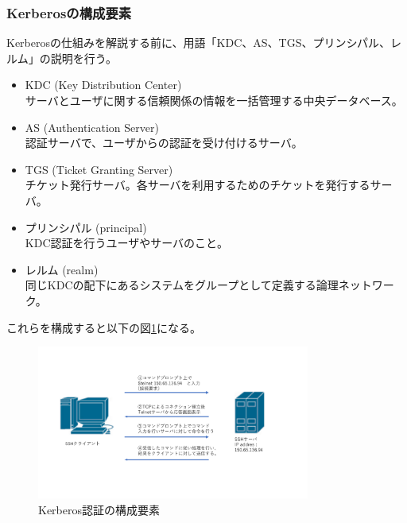 \documentclass[12pt,a4paper,titlepage]{jsarticle}
\begin{document}
\subsubsection*{Kerberosの構成要素}
Kerberosの仕組みを解説する前に、用語「KDC、AS、TGS、プリンシパル、レルム」の説明を行う。
\begin{itemize}
    \item KDC (Key Distribution Center)\mbox{}\\サーバとユーザに関する信頼関係の情報を一括管理する中央データベース。
    \item AS (Authentication Server) \mbox{}\\認証サーバで、ユーザからの認証を受け付けるサーバ。
    \item TGS (Ticket Granting Server) \mbox{}\\チケット発行サーバ。各サーバを利用するためのチケットを発行するサーバ。
    \item プリンシパル (principal) \mbox{}\\ KDC認証を行うユーザやサーバのこと。
    \item レルム (realm)\mbox{}\\同じKDCの配下にあるシステムをグループとして定義する論理ネットワーク。
\end{itemize}
これらを構成すると以下の図\ref{KerberosCompornent}になる。
\begin{figure}[h]
    \begin{center}
        \includegraphics[width=0.8\textwidth, page=11]{graphs/network_archtecture.pdf}
        \caption{Kerberos認証の構成要素}
        \label{KerberosCompornent}
    \end{center}
\end{figure}\\
\end{document}
